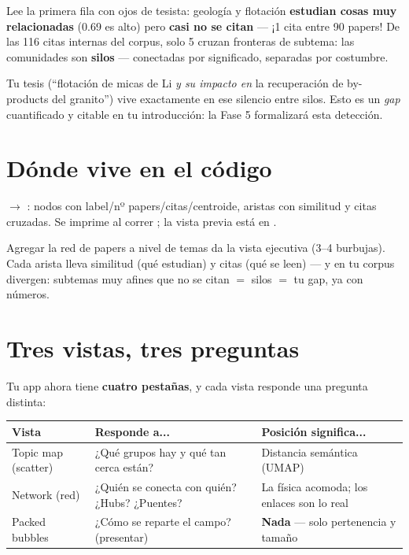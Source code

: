 \documentclass[11pt,a4paper]{article}
\begin{document}
\begin{ojo}
Lee la primera fila con ojos de tesista: geología y flotación \textbf{estudian cosas muy
relacionadas} (0.69 es alto) pero \textbf{casi no se citan} — ¡1 cita entre 90 papers! De
las 116 citas internas del corpus, solo 5 cruzan fronteras de subtema: las comunidades son
\textbf{silos} — conectadas por significado, separadas por costumbre.

Tu tesis (``flotación de micas de Li \emph{y su impacto en} la recuperación de by-products
del granito'') vive exactamente en ese silencio entre silos. Esto es un \emph{gap}
cuantificado y citable en tu introducción: la Fase 5 formalizará esta detección.
\end{ojo}

\section{Dónde vive en el código}

 $\rightarrow$ : nodos con
label/nº papers/citas/centroide, aristas con similitud y citas cruzadas. Se imprime al
correr ; la vista previa está en
.

\begin{resumen}
Agregar la red de papers a nivel de temas da la vista ejecutiva (3--4 burbujas). Cada arista
lleva similitud (qué estudian) y citas (qué se leen) — y en tu corpus divergen: subtemas muy
afines que no se citan $=$ silos $=$ tu gap, ya con números.
\end{resumen}
\clearpage
{}
{}

\section{Tres vistas, tres preguntas}

Tu app ahora tiene \textbf{cuatro pestañas}, y cada vista responde una pregunta distinta:

\begin{center}
\begin{tabular}{lp{5.2cm}p{4.6cm}}
\textbf{Vista} & \textbf{Responde a...} & \textbf{Posición significa...} \\
\hline
Topic map (scatter) & ¿Qué grupos hay y qué tan cerca están? & Distancia semántica (UMAP) \\
Network (red) & ¿Quién se conecta con quién? ¿Hubs? ¿Puentes? & La física acomoda; los enlaces son lo real \\
Packed bubbles & ¿Cómo se reparte el campo? (presentar) & \textbf{Nada} — solo pertenencia y tamaño \\
\end{tabular}
\end{center}
\end{document}
